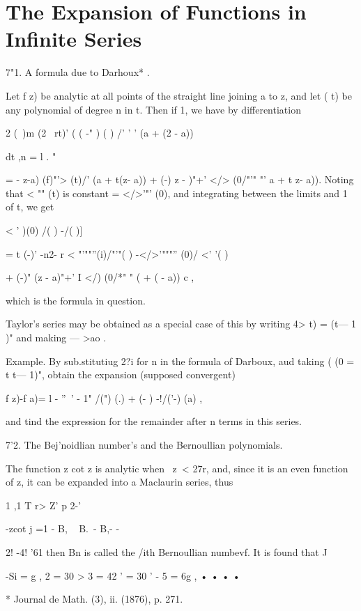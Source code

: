 \chapter{The Expansion of Functions in Infinite Series} 

7"1. A formula due to Darhoux* . 

Let f z) be analytic at all points of the straight line joining a to z, and 
let (   t) be any polynomial of degree n in t. 
Then if     1, we have by differentiation 

2 (\ )m (2 \  rt)'  (  ( -" ) ( ) /' ' ' (a +   (2 - a)) 

dt ,n = l . " 

= - z-a) (f)"'> (t)/' (a + t(z- a)) + (-)   z -  )"+' </> (0/"'" "'  a + t z- a)). 
Noting that < "" (t) is constant = </>'"' (0), and integrating between the 
limits and 1 of t, we get 

< ' )(0) /( ) -/( )] 

= t (-)' -n2- r < "'""''(i)/"'"( ) -</>'"""'' (0)/ <' '( )  

+ (-)" (z - a)"+' I </) (0/*" " (  +   (  - a)) c , 

which is the formula in question. 

Taylor's series may be obtained as a special case of this by writing 
4> t) = (t— 1 )" and making  — >ao . 

Example. By sub.stitutiug 2?i for n in the formula of Darboux, aud taking (  (0 = t  t— 1)", 
obtain the expansion (supposed convergent) 

f z)-f a)= l  -  ''~' -   1"  /(") (.) + (- ) -!/('-) (a) , 

and tind the expression for the remainder after n terms in this series. 

7'2. The Bej'noidlian number's and the Bernoullian polynomials. 

The function   z cot   z is analytic when \ z\ <  27r, and, since it is an even 
function of z, it can be expanded into a Maclaurin series, thus 



1 ,1 T r> Z' p 2-'      

-zcot  j =1 - B,   ~ B.~- B,- - 



2! -4! '61 
then Bn is called the /ith Bernoullian numbevf. It is found that J 

-Si = g ,  2 = 30 >  3 = 42 '   = 30 ' - 5 = 6g , • • • • 

* Journal de Math. (3), ii. (1876), p. 271. 

